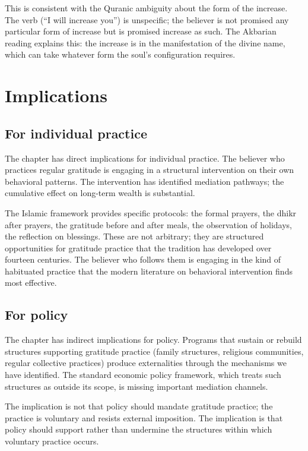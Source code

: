 This is consistent with the Quranic ambiguity about the form of
the increase. The verb  (``I will increase you'')
is unspecific; the believer is not promised any particular form
of increase but is promised increase as such. The Akbarian reading
explains this: the increase is in the manifestation of the divine
name, which can take whatever form the soul's configuration
requires.

\section{Implications}
\label{sec:grat-implications}

\subsection{For individual practice}

The chapter has direct implications for individual practice. The
believer who practices regular gratitude is engaging in a
structural intervention on their own behavioral patterns. The
intervention has identified mediation pathways; the cumulative
effect on long-term wealth is substantial.

The Islamic framework provides specific protocols: the formal
prayers, the dhikr after prayers, the gratitude before and after
meals, the observation of holidays, the reflection on blessings.
These are not arbitrary; they are structured opportunities for
gratitude practice that the tradition has developed over fourteen
centuries. The believer who follows them is engaging in the kind
of habituated practice that the modern literature on behavioral
intervention finds most effective.

\subsection{For policy}

The chapter has indirect implications for policy. Programs that
sustain or rebuild structures supporting gratitude practice
(family structures, religious communities, regular collective
practices) produce externalities through the mechanisms we have
identified. The standard economic policy framework, which treats
such structures as outside its scope, is missing important
mediation channels.

The implication is not that policy should mandate gratitude
practice; the practice is voluntary and resists external
imposition. The implication is that policy should support rather
than undermine the structures within which voluntary practice
occurs.

